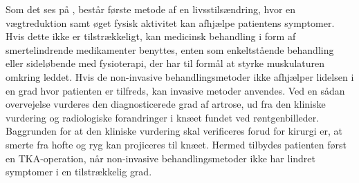 Som det ses på , består første metode af en livsstilsændring, hvor en vægtreduktion samt øget fysisk aktivitet kan afhjælpe patientens symptomer. Hvis dette ikke er tilstrækkeligt, kan medicinsk behandling i form af smertelindrende medikamenter benyttes, enten som enkeltstående behandling eller sideløbende med fysioterapi, der har til formål at styrke muskulaturen omkring leddet. Hvis de non-invasive behandlingsmetoder ikke afhjælper lidelsen i en grad hvor patienten er tilfreds, kan invasive metoder anvendes. Ved en sådan overvejelse vurderes den diagnosticerede grad af artrose, ud fra den kliniske vurdering og radiologiske forandringer i knæet fundet ved røntgenbilleder. Baggrunden for at den kliniske vurdering skal verificeres forud for kirurgi er, at smerte fra hofte og ryg kan projiceres til knæet. Hermed tilbydes patienten først en TKA-operation, når non-invasive behandlingsmetoder ikke har lindret symptomer i en tilstrækkelig grad. \citep{Lind2016b} \citep{brostrom2012} \citep{skou2016}


